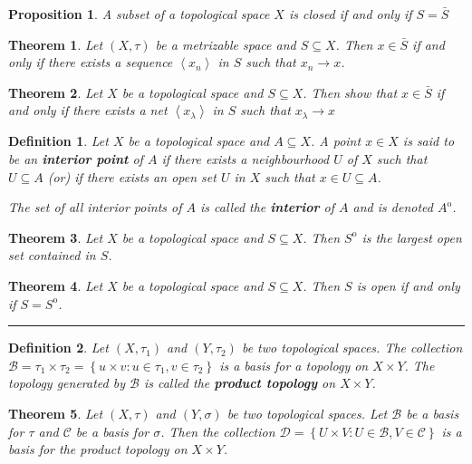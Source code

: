 \documentclass[14pt,twoside]{extreport}
\newcommand{\hhrule}{\vspace{1cm}\hrule\vspace{1cm}}
\theoremstyle{dotless}
\newtheorem*{defn}{Definition}
\newtheorem*{thm}{Theorem} %
\newtheorem*{prop}{Proposition} %
\begin{document}
\begin{prop}
    A subset of a topological space $X$ is closed if and only if $S = \bar{S}$
\end{prop}

\begin{thm}
    Let $\left (X, \tau\right )$ be a metrizable space and $S \subseteq X$. Then $x \in \bar{S}$ if and only if there exists a sequence $\left\langle x_n\right\rangle $ in $S$ such that $x_n \to x$.
\end{thm}

\begin{thm}
    Let $X$ be a topological space and $S \subseteq X$. Then show that $x \in \bar{S}$ if and only if there exists a net $\left\langle  x_\lambda \right\rangle $ in $S$ such that $ x_\lambda \to x$
\end{thm}

\begin{defn}
        Let $X$ be a topological space and $A \subseteq X$. A point $x \in X$ is said to be an \textbf{interior point} of $A$ if there exists a neighbourhood $U$ of $X$ such that $U \subseteq A$ (or) if there exists an open set $U$ in $X$ such that $x \in U \subseteq A$.

        The set of all interior points of $A$ is called the \textbf{interior} of $A$ and is denoted $A ^\mathrm{o}$.
\end{defn}

\begin{thm}
    Let $X$ be a topological space and $S \subseteq X$. Then $S ^\mathrm{o}$ is the largest open set contained in $S$.
\end{thm}

\begin{thm}
    Let $X$ be a topological space and $S \subseteq X$. Then $S$ is open if and only if $S = S ^\mathrm{o}$.
\end{thm}

\hhrule 

\begin{defn}
    Let $\left (X, \tau_1\right )$ and $\left (Y, \tau_2\right )$ be two topological spaces. The collection $\mathcal{B} = \tau_1 \times \tau_2 = \left\{ u \times v  :  u \in \tau_1, v \in \tau_2 \right\}$ is a basis for a topology on $X \times Y$.
    The topology generated by $\mathcal{B}$ is called the \textbf{product topology} on $X \times Y$.
\end{defn}

\begin{thm}
    Let $\left (X, \tau\right )$ and $\left (Y, \sigma\right )$ be two topological spaces. Let $\mathcal{B}$ be a basis for $\tau$ and $\mathcal{C}$ be a basis for $\sigma$.
    Then the collection $\mathcal{D} = \left\{ U \times V  :  U \in \mathcal{B}, V \in \mathcal{C} \right\}$ is a basis for the product topology on $X \times Y$.
\end{thm}
\end{document}
